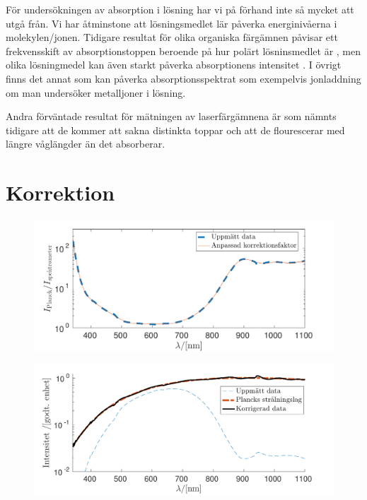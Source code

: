 \documentclass[11pt,a4paper]{article}
\begin{document}
För undersökningen av absorption i lösning har vi på förhand inte så mycket att utgå från. Vi har åtminstone att lösningsmedlet lär påverka energinivåerna i molekylen/jonen. Tidigare resultat för olika organiska färgämnen påvisar ett frekvensskift av absorptionstoppen beroende på hur polärt lösninsmedlet är \cite{Mannekutla2008}, men olika lösningmedel kan även starkt påverka absorptionens intensitet \cite{Homocianu2011}.
I övrigt finns det annat som kan påverka absorptionsspektrat som exempelvis jonladdning om man undersöker metalljoner i lösning. 

Andra förväntade resultat för mätningen av laserfärgämnena är som nämnts tidigare att de kommer att sakna distinkta toppar och att de flourescerar med längre våglängder än det absorberar.








\newpage
{}




\clearpage
\appendix
\setcounter{page}{1}
\renewcommand*{\thepage}{A\arabic{page}}

\section{Korrektion}

\begin{figure}\centering
\centerline{ %
\includegraphics[width=.9\textwidth]{korrektionsfaktor.pdf}
}
\caption{\label{fig:korrektionsfaktor} }
\end{figure}

\begin{figure}\centering
\centerline{ %
\includegraphics[width=.9\textwidth]{anpassad_svartkropp.pdf}
}
\caption{\label{fig:anpassad_svartkropp} }
\end{figure}
\end{document}
